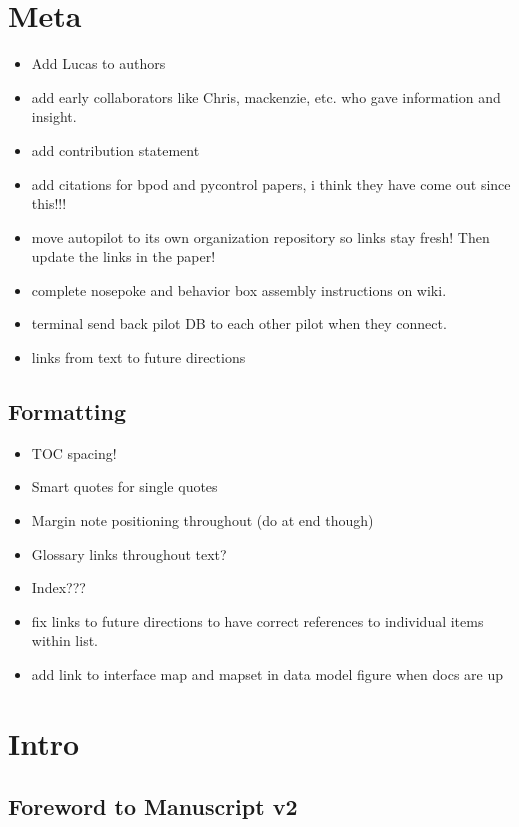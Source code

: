 \section{Meta}

\begin{itemize}
\item Add Lucas to authors
\item add early collaborators like Chris, mackenzie, etc. who gave information and insight.
\item add contribution statement
\item add citations for bpod and pycontrol papers, i think they have come out since this!!!
\item move autopilot to its own organization repository so links stay fresh! Then update the links in the paper!
\item complete nosepoke and behavior box assembly instructions on wiki.
\item terminal send back pilot DB to each other pilot when they connect.
\item links from text to future directions
\end{itemize}

\subsection{Formatting}

\begin{itemize}
\item TOC spacing!
\item Smart quotes for single quotes
\item Margin note positioning throughout (do at end though)
\item Glossary links throughout text?
\item Index???
\item fix links to future directions to have correct references to individual items within list.
\item add link to interface map and mapset in data model figure when docs are up
\end{itemize}

\section{Intro}

\subsection{Foreword to Manuscript v2}

